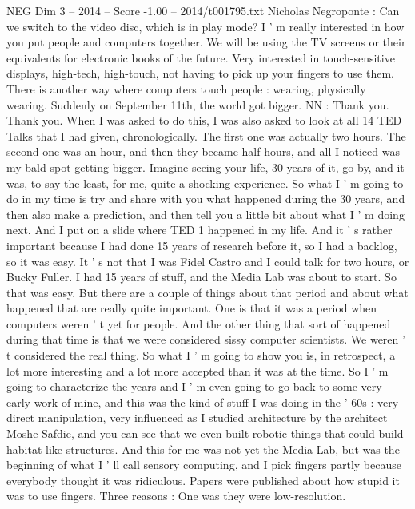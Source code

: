 \begin{textsample}{NEG Dim 3 – 2014 – Score -1.00 – 2014/t001795.txt}  \label{ex:f3_neg_048}
Nicholas Negroponte : Can we switch to the video disc, which is in play mode?
I ' m really interested in how you put people and computers together.
We will be using the TV screens or their equivalents for electronic books of the future.
Very interested in touch-sensitive displays, high-tech, high-touch, not having to pick up your fingers to use them.
There is another way where computers touch people : wearing, physically wearing.
Suddenly on September 11th, the world got bigger.
NN : Thank you.
Thank you.
When I was asked to do this, I was also asked to look at all 14 TED Talks that I had given, chronologically.
The first one was actually two hours.
The second one was an hour, and then they became half hours, and all I noticed was my bald spot getting bigger.
Imagine seeing your life, 30 years of it, go by, and it was, to say the least, for me, quite a shocking experience.
So what I ' m going to do in my time is try and share with you what happened during the 30 years, and then also make a prediction, and then tell you a little bit about what I ' m doing next.
And I put on a slide where TED 1 happened in my life.
And it ' s rather important because I had done 15 years of research before it, so I had a backlog, so it was easy.
It ' s not that I was Fidel Castro and I could talk for two hours, or Bucky Fuller.
I had 15 years of stuff, and the Media Lab was about to start.
So that was easy.
But there are a couple of things about that period and about what happened that are really quite important.
One is that it was a period when computers weren ' t yet for people.
And the other thing that sort of happened during that time is that we were considered sissy computer scientists.
We weren ' t considered the real thing.
So what I ' m going to show you is, in retrospect, a lot more interesting and a lot more accepted than it was at the time.
So I ' m going to characterize the years and I ' m even going to go back to some very early work of mine, and this was the kind of stuff I was doing in the ' 60s : very direct manipulation, very influenced as I studied architecture by the architect Moshe Safdie, and you can see that we even built robotic things that could build habitat-like structures.
And this for me was not yet the Media Lab, but was the beginning of what I ' ll call sensory computing, and I pick fingers partly because everybody thought it was ridiculous.
Papers were published about how stupid it was to use fingers.
Three reasons : One was they were low-resolution.

\end{textsample}
